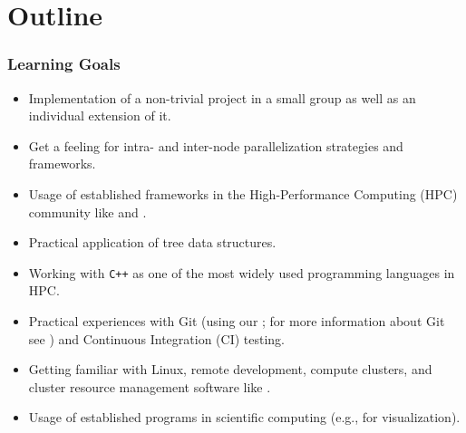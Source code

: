 \section*{Outline}
\begin{frame}
  \frametitle{Learning Goals}
    \begin{itemize}
        \item Implementation of a non-trivial project in a small group as well as an individual extension of it.
        \item Get a feeling for intra- and inter-node parallelization strategies and frameworks.
        \item Usage of established frameworks in the High-Performance Computing (HPC) community like  and .
        \item Practical application of tree data structures.
        \item Working with \texttt{C++} as one of the most widely used programming languages in HPC.
        \item Practical experiences with Git (using our ; for more information about Git see ) and Continuous Integration (CI) testing.
        \item Getting familiar with Linux, remote development, compute clusters, and cluster resource management software like .
        \item Usage of established programs in scientific computing (e.g.,  for visualization).
    \end{itemize}
\end{frame}

